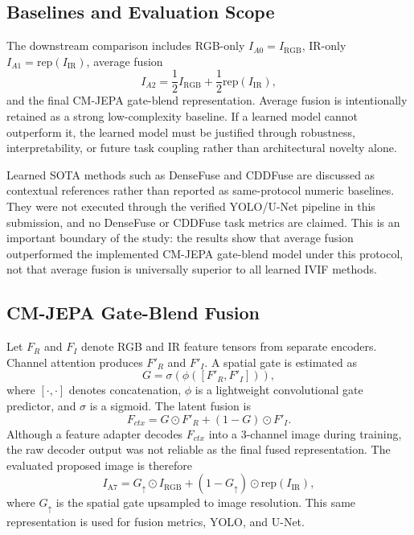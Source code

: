 \documentclass[conference,a4paper]{IEEEtran}
\newcommand{\RGB}{I_{\mathrm{RGB}}}
\newcommand{\IR}{I_{\mathrm{IR}}}
\newcommand{\Ia}{I_{\mathrm{A7}}}
\newcommand{\G}{G_{\uparrow}}
\begin{document}
\subsection{Baselines and Evaluation Scope}
The downstream comparison includes RGB-only \(I_{A0}=\RGB\), IR-only \(I_{A1}=\mathrm{rep}(\IR)\), average fusion
\begin{equation}
I_{A2}=\frac{1}{2}\RGB + \frac{1}{2}\mathrm{rep}(\IR),
\label{eq:avg}
\end{equation}
and the final CM-JEPA gate-blend representation. Average fusion is intentionally retained as a strong low-complexity baseline. If a learned model cannot outperform it, the learned model must be justified through robustness, interpretability, or future task coupling rather than architectural novelty alone.

Learned SOTA methods such as DenseFuse and CDDFuse are discussed as contextual references rather than reported as same-protocol numeric baselines. They were not executed through the verified YOLO/U-Net pipeline in this submission, and no DenseFuse or CDDFuse task metrics are claimed. This is an important boundary of the study: the results show that average fusion outperformed the implemented CM-JEPA gate-blend model under this protocol, not that average fusion is universally superior to all learned IVIF methods.

\subsection{CM-JEPA Gate-Blend Fusion}
Let \(F_R\) and \(F_I\) denote RGB and IR feature tensors from separate encoders. Channel attention produces \(F'_R\) and \(F'_I\). A spatial gate is estimated as
\begin{equation}
G = \sigma\left(\phi([F'_R,F'_I])\right),
\end{equation}
where \([\cdot,\cdot]\) denotes concatenation, \(\phi\) is a lightweight convolutional gate predictor, and \(\sigma\) is a sigmoid. The latent fusion is
\begin{equation}
F_{ctx}=G\odot F'_R+(1-G)\odot F'_I.
\label{eq:latentfusion}
\end{equation}
Although a feature adapter decodes \(F_{ctx}\) into a 3-channel image during training, the raw decoder output was not reliable as the final fused representation. The evaluated proposed image is therefore
\begin{equation}
\Ia=\G\odot\RGB+(1-\G)\odot\mathrm{rep}(\IR),
\label{eq:gateblend}
\end{equation}
where \(\G\) is the spatial gate upsampled to image resolution. This same representation is used for fusion metrics, YOLO, and U-Net.
\end{document}
